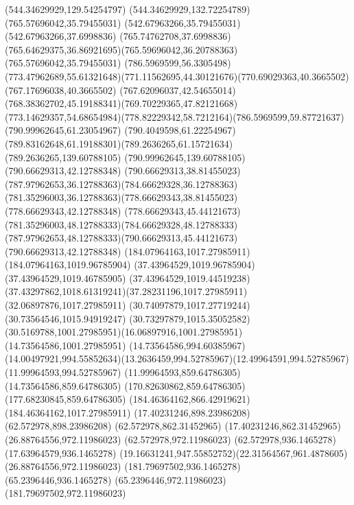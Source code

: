 {{	\lineto(544.34629929,129.54254797)
	\lineto(544.34629929,132.72254789)
	\closepath
	\moveto(765.57696042,35.79455031)
	\lineto(542.67963266,35.79455031)
	\lineto(542.67963266,37.6998836)
	\lineto(765.74762708,37.6998836)
	\curveto(765.64629375,36.86921695)(765.59696042,36.20788363)(765.57696042,35.79455031)
	\moveto(786.5969599,56.3305498)
	\curveto(773.47962689,55.61321648)(771.11562695,44.30121676)(770.69029363,40.3665502)
	\lineto(767.17696038,40.3665502)
	\curveto(767.62096037,42.54655014)(768.38362702,45.19188341)(769.70229365,47.82121668)
	\curveto(773.14629357,54.68654984)(778.82229342,58.7212164)(786.5969599,59.87721637)
	\closepath
	\moveto(790.99962645,61.23054967)
	\curveto(790.4049598,61.22254967)(789.83162648,61.19188301)(789.2636265,61.15721634)
	\lineto(789.2636265,139.60788105)
	\lineto(790.99962645,139.60788105)
	\closepath
	\moveto(790.66629313,42.12788348)
	\curveto(790.66629313,38.81455023)(787.97962653,36.12788363)(784.66629328,36.12788363)
	\curveto(781.35296003,36.12788363)(778.66629343,38.81455023)(778.66629343,42.12788348)
	\curveto(778.66629343,45.44121673)(781.35296003,48.12788333)(784.66629328,48.12788333)
	\curveto(787.97962653,48.12788333)(790.66629313,45.44121673)(790.66629313,42.12788348)
	\moveto(184.07964163,1017.27985911)
	\lineto(184.07964163,1019.96785904)
	\lineto(37.43964529,1019.96785904)
	\lineto(37.43964529,1019.46785905)
	\curveto(37.43964529,1019.44519238)(37.43297862,1018.61319241)(37.28231196,1017.27985911)
	\lineto(32.06897876,1017.27985911)
	\lineto(30.74097879,1017.27719244)
	\lineto(30.73564546,1015.94919247)
	\curveto(30.73297879,1015.35052582)(30.5169788,1001.27985951)(16.06897916,1001.27985951)
	\lineto(14.73564586,1001.27985951)
	\lineto(14.73564586,994.60385967)
	\curveto(14.00497921,994.55852634)(13.2636459,994.52785967)(12.49964591,994.52785967)
	\lineto(11.99964593,994.52785967)
	\lineto(11.99964593,859.64786305)
	\lineto(14.73564586,859.64786305)
	\lineto(170.82630862,859.64786305)
	\lineto(177.68230845,859.64786305)
	\lineto(184.46364162,866.42919621)
	\lineto(184.46364162,1017.27985911)
	\closepath
	\moveto(17.40231246,898.23986208)
	\lineto(62.572978,898.23986208)
	\lineto(62.572978,862.31452965)
	\lineto(17.40231246,862.31452965)
	\closepath
	\moveto(26.88764556,972.11986023)
	\lineto(62.572978,972.11986023)
	\lineto(62.572978,936.1465278)
	\lineto(17.63964579,936.1465278)
	\curveto(19.16631241,947.55852752)(22.31564567,961.4878605)(26.88764556,972.11986023)
	\moveto(181.79697502,936.1465278)
	\lineto(65.2396446,936.1465278)
	\lineto(65.2396446,972.11986023)
	\lineto(181.79697502,972.11986023)
}}
